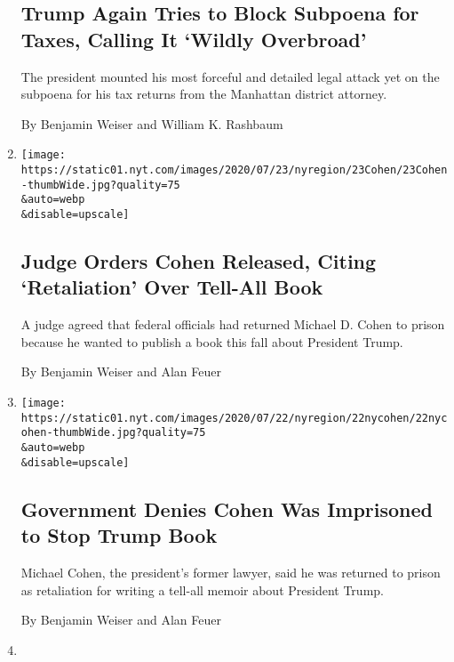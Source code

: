 \begin{enumerate}
{  \subsection{Trump Again Tries to Block Subpoena for Taxes, Calling It
  `Wildly
  Overbroad'}\label{trump-again-tries-to-block-subpoena-for-taxes-calling-it-wildly-overbroad}}

  The president mounted his most forceful and detailed legal attack yet
  on the subpoena for his tax returns from the Manhattan district
  attorney.

  By Benjamin Weiser and William K. Rashbaum
\item
  \href{/2020/07/23/nyregion/michael-cohen-trump-book.html}{}

  \texttt{[image: https://static01.nyt.com/images/2020/07/23/nyregion/23Cohen/23Cohen-thumbWide.jpg?quality=75\\\&auto=webp\\\&disable=upscale]}

  \hypertarget{judge-orders-cohen-released-citing-retaliation-over-tell-all-book}{%
  \subsection{Judge Orders Cohen Released, Citing `Retaliation' Over
  Tell-All
  Book}\label{judge-orders-cohen-released-citing-retaliation-over-tell-all-book}}

  A judge agreed that federal officials had returned Michael D. Cohen to
  prison because he wanted to publish a book this fall about President
  Trump.

  By Benjamin Weiser and Alan Feuer
\item
  \href{/2020/07/22/nyregion/michael-cohen-donald-trump-prison.html}{}

  \texttt{[image: https://static01.nyt.com/images/2020/07/22/nyregion/22nycohen/22nycohen-thumbWide.jpg?quality=75\\\&auto=webp\\\&disable=upscale]}

  \hypertarget{government-denies-cohen-was-imprisoned-to-stop-trump-book}{%
  \subsection{Government Denies Cohen Was Imprisoned to Stop Trump
  Book}\label{government-denies-cohen-was-imprisoned-to-stop-trump-book}}

  Michael Cohen, the president's former lawyer, said he was returned to
  prison as retaliation for writing a tell-all memoir about President
  Trump.

  By Benjamin Weiser and Alan Feuer
\item
  \href{/2020/07/21/nyregion/michael-cohen-trump-book.html}{}


\end{enumerate}
